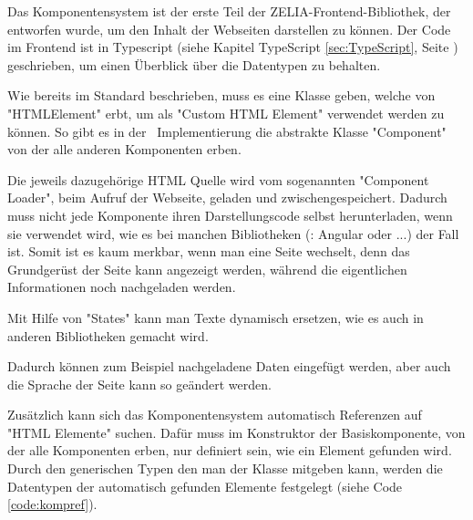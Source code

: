 \label{sec:webcompimp}



Das Komponentensystem ist der erste Teil der ZELIA-Frontend-Bibliothek, der entworfen wurde, um den Inhalt der Webseiten darstellen zu können. Der Code im Frontend ist in Typescript (siehe Kapitel TypeScript \ref{sec:TypeScript}, Seite \pageref{sec:TypeScript}) geschrieben, um einen Überblick über die Datentypen zu behalten.


Wie bereits im Standard beschrieben, muss es eine Klasse geben, welche von "HTMLElement" erbt, um als "Custom HTML Element" verwendet werden zu können. So gibt es in der \ZELIA\ Implementierung die abstrakte Klasse "Component" von der alle anderen Komponenten erben.


Die jeweils dazugehörige HTML Quelle wird vom sogenannten "Component Loader", beim Aufruf der Webseite, geladen und zwischengespeichert. Dadurch muss nicht jede Komponente ihren Darstellungscode selbst herunterladen, wenn sie verwendet wird, wie es bei manchen Bibliotheken (\zb: Angular oder ...) der Fall ist. Somit ist es kaum merkbar, wenn man eine Seite wechselt, denn das Grundgerüst der Seite kann angezeigt werden, während die eigentlichen Informationen noch nachgeladen werden. 

Mit Hilfe von "States" kann man Texte dynamisch ersetzen, wie es auch in anderen Bibliotheken gemacht wird.



Dadurch können zum Beispiel nachgeladene Daten eingefügt werden, aber auch die Sprache der Seite kann so geändert werden.

Zusätzlich kann sich das Komponentensystem automatisch Referenzen auf "HTML Elemente" suchen. Dafür muss im Konstruktor der Basiskomponente, von der alle Komponenten erben, nur definiert sein, wie ein Element gefunden wird. Durch den generischen Typen den man der Klasse mitgeben kann, werden die Datentypen der automatisch gefunden Elemente festgelegt (siehe Code \ref{code:kompref}).

